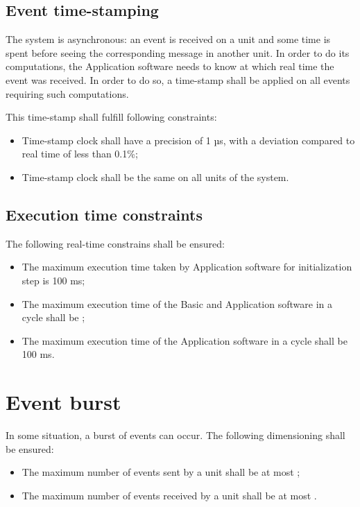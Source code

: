 \subsection{Event time-stamping}

The system is asynchronous: an event is received on a unit and some
time is spent before seeing the corresponding message in another
unit. In order to do its computations, the Application software needs
to know at which real time the event was received. In order to do so,
a time-stamp shall be applied on all events requiring such
computations. 

This time-stamp shall fulfill
following constraints:
\begin{itemize}
\item Time-stamp clock shall have a precision of 1 µs, with a
  deviation compared to real time of less than 0.1\%;
\item Time-stamp clock shall be the same on all units of the system.
\end{itemize}

\subsection{Execution time constraints}

The following real-time constrains shall be ensured:
\begin{itemize}
\item The maximum execution time taken by Application software for
  initialization step is 100 ms;
\item The maximum execution time of the Basic and Application software
  in a cycle shall be ;
\item The maximum execution time of the Application software in a
  cycle shall be 100 ms.
\end{itemize}

\section{Event burst}

In some situation, a burst of events can occur. The following
dimensioning shall be ensured:
\begin{itemize}
\item The maximum number of events sent by a unit shall be at most
  ;
\item The maximum number of events received by a unit shall be at most
  .
\end{itemize}



